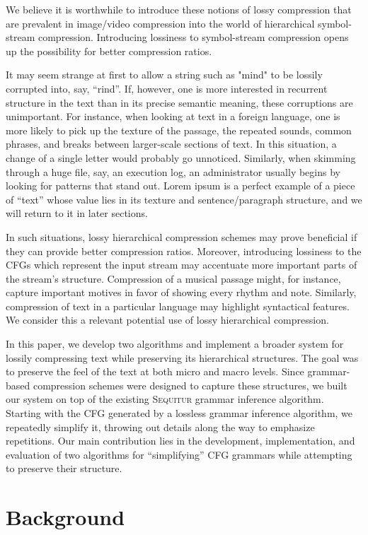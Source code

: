 \documentclass[11pt]{article}
\newcommand{\Sequitur}{\textsc{Sequitur}\xspace}
\begin{document}
We believe it is worthwhile to introduce these notions of lossy compression
that are prevalent in image/video compression into the world of hierarchical
symbol-stream compression. Introducing lossiness to symbol-stream compression 
opens up the possibility for better compression ratios.

It may seem strange at first to allow a string such as "mind" to be lossily
corrupted into, say, ``rind''.  If, however, one is more interested in
recurrent structure in the text than in its precise semantic meaning, these
corruptions are unimportant.  For instance, when looking at text in a foreign
language, one is more likely to pick up the texture of the passage, the
repeated sounds, common phrases, and breaks between larger-scale sections of
text.  In this situation, a change of a single letter would probably go
unnoticed.  Similarly, when skimming through a huge file, say, an execution
log, an administrator usually begins by looking for patterns that stand out.
Lorem ipsum is a perfect example of a piece of ``text'' whose value lies in its
texture and sentence/paragraph structure, and we will return to it in later
sections.

In such situations, lossy hierarchical compression schemes may prove beneficial
if they can provide better compression ratios.  Moreover, introducing lossiness
to the CFGs which represent the input stream may accentuate more important
parts of the stream's structure.  Compression of a musical passage might, for
instance, capture important motives in favor of showing every rhythm and note.
Similarly, compression of text in a particular language may highlight
syntactical features.  We consider this a relevant potential use of lossy
hierarchical compression.

In this paper, we develop two algorithms and implement a broader system for
lossily compressing text while preserving its hierarchical structures.  The
goal was to preserve the feel of the text at both micro and macro levels.
Since grammar-based compression schemes were designed to capture these
structures, we built our system on top of the existing \Sequitur grammar
inference algorithm.  Starting with the CFG generated by a lossless grammar
inference algorithm, we repeatedly simplify it, throwing out details along the
way to emphasize repetitions.  Our main contribution lies in the development,
implementation, and evaluation of two algorithms for ``simplifying'' CFG
grammars while attempting to preserve their structure.

\section{Background}
\end{document}
